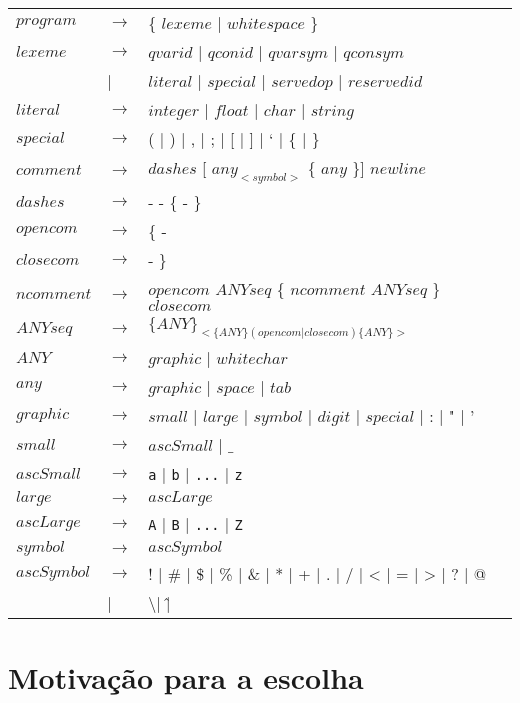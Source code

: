 \documentclass[
	article,			%
	11pt,				%
	oneside,			%
	a4paper,			%
	english,			%
	brazil,				%
	sumario=tradicional
	]{abntex2}
\begin{document}
\begin{tabular}{ l l l } 
	$ program $   & $ \rightarrow $ & \{ $lexeme$ | $whitespace$ \} \\
	$ lexeme $    & $ \rightarrow $ & $qvarid$ | $qconid$ | $qvarsym$ | $qconsym$ \\
				  & |				  & $literal$ | $special$ | $servedop$ | $reservedid$ \\
	$ literal $   & $ \rightarrow $ & $integer$ | $float$ | $char$ | $string$ \\
	$ special $   & $ \rightarrow $ & ( | ) | , | ; | [ | ] | ` | \{ | \} \\
	$ comment $   & $ \rightarrow $ & $dashes$ [ $any_{<symbol>}$ \{ $any$ \}] $newline$ \\
	$ dashes $    & $ \rightarrow $ & - - \{ - \} \\
	$ opencom $   & $ \rightarrow $ & \{ - \\
	$ closecom $  & $ \rightarrow $ & - \} \\
	$ ncomment $  & $ \rightarrow $ & $opencom$ $ANYseq$ \{ $ncomment$ $ANYseq$ \} $closecom$ \\
	$ ANYseq$     & $ \rightarrow $ & $\{ANY\}_{<\{ANY\} ( opencom | closecom ) \{ANY\}>}$ \\
	$ ANY $       & $ \rightarrow $ & $graphic$ | $whitechar$ \\
	$ any $       & $ \rightarrow $ & $graphic$ | $space$ | $tab$ \\
	$ graphic $   & $ \rightarrow $ & $small$ | $large$ | $symbol$ | $digit$ | $special$ | : | " | ' \\
	$ small $	  & $ \rightarrow $ & $ascSmall$ | $\_$ \\
	$ ascSmall $  & $ \rightarrow $ & \texttt{a} | \texttt{b} | \texttt{...} | \texttt{z} \\
	$ large $     & $ \rightarrow $ & $ascLarge$ \\
	$ ascLarge $  & $ \rightarrow $ & \texttt{A} | \texttt{B} | \texttt{...} | \texttt{Z} \\
	$ symbol $    & $ \rightarrow $ & $ascSymbol$ \\
	$ ascSymbol $ & $ \rightarrow $ & ! | \# | \$ | \% | \& | * | + | . | / | < | = | > | ? | @ \\
				  & |				& \textbackslash | \^ | \\
\end{tabular}


\section{Motivação para a escolha}
\end{document}
